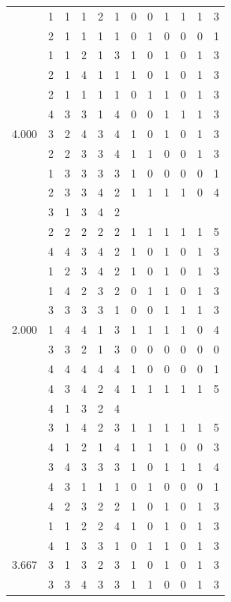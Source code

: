 \documentclass[]{msu-thesis}
\theoremstyle{definition}
\theoremstyle{definition}
\theoremstyle{definition}
\theoremstyle{remark}
\begin{document}
\begin{table}
{\begin{tabular}[t]{rrrrrrrrrrrr}
 & 1 & 1 & 1 & 2 & 1 & 0 & 0 & 1 & 1 & 1 & 3\\
 & 2 & 1 & 1 & 1 & 1 & 0 & 1 & 0 & 0 & 0 & 1\\
 & 1 & 1 & 2 & 1 & 3 & 1 & 0 & 1 & 0 & 1 & 3\\
 & 2 & 1 & 4 & 1 & 1 & 1 & 0 & 1 & 0 & 1 & 3\\
 & 2 & 1 & 1 & 1 & 1 & 0 & 1 & 1 & 0 & 1 & 3\\
 & 4 & 3 & 3 & 1 & 4 & 0 & 0 & 1 & 1 & 1 & 3\\
4.000 & 3 & 2 & 4 & 3 & 4 & 1 & 0 & 1 & 0 & 1 & 3\\
 & 2 & 2 & 3 & 3 & 4 & 1 & 1 & 0 & 0 & 1 & 3\\
 & 1 & 3 & 3 & 3 & 3 & 1 & 0 & 0 & 0 & 0 & 1\\
 & 2 & 3 & 3 & 4 & 2 & 1 & 1 & 1 & 1 & 0 & 4\\
 & 3 & 1 & 3 & 4 & 2 &  &  &  &  &  & \\
 & 2 & 2 & 2 & 2 & 2 & 1 & 1 & 1 & 1 & 1 & 5\\
 & 4 & 4 & 3 & 4 & 2 & 1 & 0 & 1 & 0 & 1 & 3\\
 & 1 & 2 & 3 & 4 & 2 & 1 & 0 & 1 & 0 & 1 & 3\\
 & 1 & 4 & 2 & 3 & 2 & 0 & 1 & 1 & 0 & 1 & 3\\
 & 3 & 3 & 3 & 3 & 1 & 0 & 0 & 1 & 1 & 1 & 3\\
2.000 & 1 & 4 & 4 & 1 & 3 & 1 & 1 & 1 & 1 & 0 & 4\\
 & 3 & 3 & 2 & 1 & 3 & 0 & 0 & 0 & 0 & 0 & 0\\
 & 4 & 4 & 4 & 4 & 4 & 1 & 0 & 0 & 0 & 0 & 1\\
 & 4 & 3 & 4 & 2 & 4 & 1 & 1 & 1 & 1 & 1 & 5\\
 & 4 & 1 & 3 & 2 & 4 &  &  &  &  &  & \\
 & 3 & 1 & 4 & 2 & 3 & 1 & 1 & 1 & 1 & 1 & 5\\
 & 4 & 1 & 2 & 1 & 4 & 1 & 1 & 1 & 0 & 0 & 3\\
 & 3 & 4 & 3 & 3 & 3 & 1 & 0 & 1 & 1 & 1 & 4\\
 & 4 & 3 & 1 & 1 & 1 & 0 & 1 & 0 & 0 & 0 & 1\\
 & 4 & 2 & 3 & 2 & 2 & 1 & 0 & 1 & 0 & 1 & 3\\
 & 1 & 1 & 2 & 2 & 4 & 1 & 0 & 1 & 0 & 1 & 3\\
 & 4 & 1 & 3 & 3 & 1 & 0 & 1 & 1 & 0 & 1 & 3\\
3.667 & 3 & 1 & 3 & 2 & 3 & 1 & 0 & 1 & 0 & 1 & 3\\
 & 3 & 3 & 4 & 3 & 3 & 1 & 1 & 0 & 0 & 1 & 3\\

\end{tabular}}
\end{table}
\end{document}
